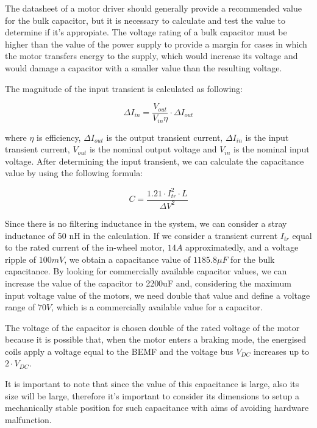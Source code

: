 The datasheet of a motor driver should generally provide a recommended value for the bulk capacitor, but it is necessary to calculate and test the value to determine if it's appropiate. The voltage rating of a bulk capacitor must be higher than the value of the power supply to provide a margin for cases in which the motor transfers energy to the supply, which would increase its voltage and would damage a capacitor with a smaller value than the resulting voltage.

The magnitude of the input transient is calculated as following:

\begin{equation} \label{current_ripple}
	\Delta I_{in} = \frac{V_{out}}{V_{in}\eta}\cdot \Delta I_{out}
\end{equation}

where $\eta$ is efficiency, $\Delta I_{out}$ is the output transient current, $\Delta I_{in}$ is the input transient current, $V_{out}$ is the nominal output voltage and $V_{in}$ is the nominal input voltage. After determining the input transient, we can calculate the capacitance value by using the following formula:

\begin{equation} \label{current_ripple_2}
	C = \frac{1.21 \cdot I_{tr}^{2} \cdot L}{\Delta V^{2}}
\end{equation}



Since there is no filtering inductance in the system, we can consider a stray inductance of 50 nH in the calculation. If we consider a transient current $I_{tr}$ equal to the rated current of the in-wheel motor, $14 A$ approximatedly, and a voltage ripple of $100 mV$, we obtain a capacitance value of $1185.8\mu F$ for the bulk capacitance. By looking for commercially available capacitor values, we can increase the value of the capacitor to 2200uF and, considering the maximum input voltage value of the motors, we need double that value and define a voltage range of $70V$, which is a commercially available value for a capacitor.

The voltage of the capacitor is chosen double of the rated voltage of the motor because it is possible that, when the motor enters a braking mode, the energised coils apply a voltage equal to the \ac{BEMF} and the voltage bus $V_{DC}$ increases up to $2\cdot V_{DC}$.

It is important to note that since the value of this capacitance is large, also its size will be large, therefore it's important to consider its dimensions to setup a mechanically stable position for such capacitance with aims of avoiding hardware malfunction.

